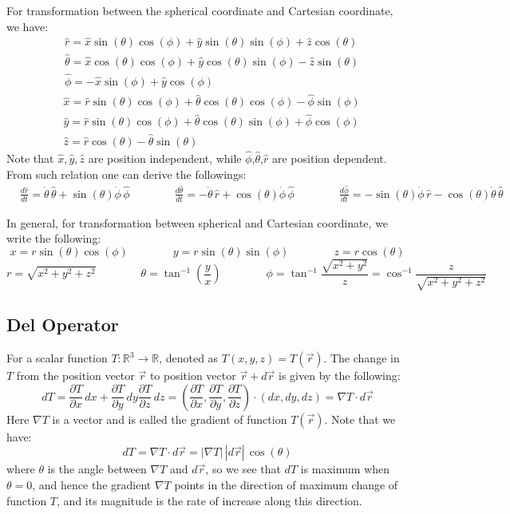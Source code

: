 \documentclass[11pt,oneside]{book}
\theoremstyle{break}
\theoremstyle{break}
\newcommand{\R}{\mathbb{R}}
\newcommand{\pd}{\partial}
\begin{document}
\hfill\break
For transformation between the spherical coordinate and Cartesian coordinate, we have:
\begin{align*}
&\hat{r} = \hat{x}\sin(\theta) \cos(\phi) + \hat{y}\sin(\theta) \sin(\phi) + \hat{z}\cos(\theta)\\
&\hat{\theta} = \hat{x}\cos(\theta) \cos(\phi) + \hat{y}\cos(\theta)\sin(\phi)  - \hat{z}\sin(\theta) \\ 
&\hat{\phi} = -\hat{x}\sin(\phi) + \hat{y}\cos(\phi)
\end{align*}
\begin{align*}
&\hat{x} = \hat{r}\sin(\theta)\cos(\phi) + \hat{\theta}\cos(\theta) \cos(\phi) - \hat{\phi}\sin(\phi)\\
&\hat{y} = \hat{r}\sin(\theta)\cos(\phi) + \hat{\theta}\cos(\theta)\sin(\phi) + \hat{\phi}\cos(\phi)\\
&\hat{z} = \hat{r}\cos(\theta) - \hat{\theta}\sin(\theta)
\end{align*}
Note that $\hat{x},\hat{y},\hat{z}$ are position independent, while $\hat{\phi}$,$\hat{\theta}$,$\hat{r}$ are position dependent.\\

From such relation one can derive the followings:
\begin{align*}
&\frac{d \hat{r}}{dt} = \dot{\theta}\, \hat{\theta} + \sin(\theta) \dot{\phi}\, \hat{\phi}\qquad\qquad \frac{d\hat{\theta}}{dt}=-\dot{\theta}\,\hat{r}+\cos(\theta)\dot{\phi}\, \hat{\phi}\qquad\qquad \frac{d\hat{\phi}}{dt} = -\sin(\theta)\dot{\phi}\,\hat{r} - \cos(\theta) \dot{\theta}\, \hat{\theta} 
\end{align*}

In general, for transformation between spherical and Cartesian coordinate, we write the following:
$$
x = r \sin(\theta) \cos(\phi) \qquad\qquad y = r \sin(\theta) \sin(\phi) \qquad\qquad z = r\cos(\theta)
$$
$$r = \sqrt{x^2 + y^2 + z^2} \qquad\qquad \theta = \tan^{-1}\left(\frac{y}{x} \right)\qquad\qquad \phi = \tan^{-1}\frac{\sqrt{x^2+y^2}}{z} = \cos^{-1}\frac{z}{\sqrt{x^2+y^2+z^2}}$$


\subsection*{Del Operator}
For a scalar function $T:\R^3 \to \R$, denoted as $T(x,y,z) = T(\vec{r})$. The change in $T$ from the position vector $\vec{r}$ to position vector $\vec{r}+ d\vec{r}$ is given by the following:
$$dT = \frac{\partial T}{\partial x}\,dx + \frac{\partial T}{\partial y}\,dy \frac{\partial T}{\partial z}\,dz = \left( \frac{\pd T}{\pd x}, \frac{\pd T}{\pd y}, \frac{\pd T}{\pd z}\right) \cdot (dx,dy,dz) = \nabla T \cdot d\vec{r}$$
Here $\nabla T$ is a vector and is called the gradient of function $T(\vec{r})$. Note that we have: 
$$dT = \nabla T\cdot d\vec{r} = |\nabla T|\, |d\vec{r}| \, \cos(\theta)$$ where $\theta$ is the angle between $\nabla T$ and $d\vec{r}$, so we see that $dT$ is maximum when $\theta  = 0$, and hence the gradient $\nabla T$ points in the direction of maximum change of function $T$, and its magnitude is the rate of increase along this direction. \\
\end{document}
